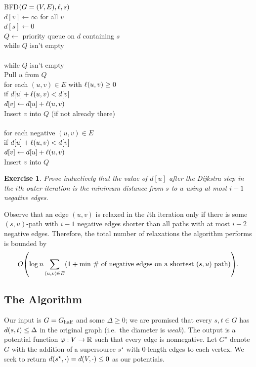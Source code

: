 \documentclass[12pt]{article}
\newtheorem*{exercise}{Exercise}
\begin{document}
\begin{centeralgo}
  \textsc{BFD}$(G = (V, E), \len, s)$\+
  \\  $d[v] \gets \infty$ for all $v$
  \\  $d[s] \gets 0$
  \\  $Q \gets $ priority queue on $d$ containing $s$
  \\  while $Q$ isn't empty\+
  \\    
  \\    while $Q$ isn't empty\+
  \\      Pull $u$ from $Q$
  \\      for each $(u, v) \in E$ with $\len{u, v} \geq 0$\+
  \\        if $d[u] + \len{u, v} < d[v]$\+
  \\            $d[v] \gets d[u] + \len{u, v}$
  \\            Insert $v$ into $Q$ (if not already there)\-\-\-
  \\    
  \\    for each negative $(u, v) \in E$\+
  \\      if $d[u] + \len{u, v} < d[v]$\+
  \\        $d[v] \gets d[u] + \len{u, v}$
  \\        Insert $v$ into $Q$
\end{centeralgo}
\begin{exercise}
  Prove inductively that the value of $d[u]$ after the Dijkstra step in the
  $i$th outer iteration is the minimum distance from $s$ to $u$ using at most
  $i - 1$ negative edges.
\end{exercise}
Observe that an edge $(u, v)$ is relaxed in the $i$th iteration only if there is
some $(s, u)$-path with $i - 1$ negative edges shorter than all paths with at
most $i - 2$ negative edges. Therefore, the total number of relaxations the
algorithm performs is bounded by
\[
  \bigO{\log n\sum_{(u, v) \in E} \paren{1 + \text{min \# of negative edges on a
        shortest $(s, u)$ path}}}.
\]

\subsection{The Algorithm}

Our input is $G = G_{\text{half}}$ and some $\Delta \geq 0$; we are promised that every
$s, t \in G$ has $\dist{s, t} \leq \Delta$ in the original graph (i.e.\ the
diameter is \emph{weak}). The output is a potential function
$\varphi : V \to \mathbb{R}$ such that every edge is nonnegative. Let $G^\star$ denote
$G$ with the addition of a supersource $s^\star$ with $0$-length edges to each
vertex. We seek to return $\dist{s^\star, \cdot} = \dist{V, \cdot} \leq 0$ as
our potentials.
\end{document}
